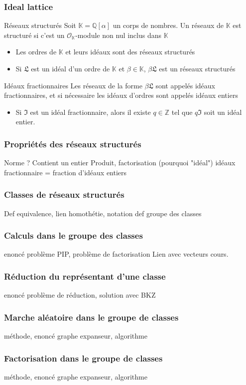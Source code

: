 \documentclass[11pt]{beamer}
\newcommand{\Z}[0]{\mathbb{Z}}
\newcommand{\Q}[0]{\mathbb{Q}}
\newcommand{\K}[0]{\mathbb{K}}
\newcommand{\LR}[0]{\mathfrak{L}}
\newcommand{\OR}[0]{\mathcal{O}}
\newcommand{\IR}[0]{\mathfrak{I}}
\begin{document}
	\begin{frame}
		\frametitle{Ideal lattice}
		\begin{block}{Réseaux structurés}
			Soit $\K = \Q[\alpha]$ un corps de nombres. Un réseaux de $\K$ est structuré si c'est un $\OR_\K$-module non nul inclus dans $\K$
		\end{block}
		\begin{itemize}
			\item Les ordres de $\K$ et leurs idéaux sont des réseaux structurés 
			\item Si $\LR$ est un idéal d'un ordre de $\K$ et $\beta\in\K$, $\beta\LR$ est un réseaux structurés
		\end{itemize}
		\begin{block}{Idéaux fractionnaires}
			Les réseaux de la forme $\beta\LR$ sont appelés idéaux fractionnaires, et si nécessaire les idéaux d'ordres sont appelés idéaux entiers 
		\end{block}
		\begin{itemize}
			\item Si $\IR$ est un idéal fractionnaire, alors il existe $q\in\Z$ tel que $q\IR$ soit un idéal entier. 
		\end{itemize}
	\end{frame}
	
	\begin{frame}
		\frametitle{Propriétés des réseaux structurés}
		Norme ? Contient un entier Produit, factorisation (pourquoi "idéal")
		idéaux fractionnaire = fraction d'idéaux entiers
	\end{frame}
	
	\begin{frame}
		\frametitle{Classes de réseaux structurés}
		Def equivalence, lien homothétie, notation
		def groupe des classes
	\end{frame}
	
	\begin{frame}
		\frametitle{Calculs dans le groupe des classes}
		enoncé problème PIP, problème de factorisation
		Lien avec vecteurs cours.
	\end{frame}
	
	\begin{frame}
		\frametitle{Réduction du représentant d'une classe}
		enoncé problème de réduction, solution avec BKZ
	\end{frame}
	
	\begin{frame}
		\frametitle{Marche aléatoire dans le groupe de classes}
		méthode, enoncé graphe expanseur, algorithme
	\end{frame}
	
	\begin{frame}
		\frametitle{Factorisation dans le groupe de classes}
		méthode, enoncé graphe expanseur, algorithme
	\end{frame}
	
	
\end{document}
